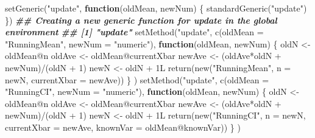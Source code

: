 \documentclass[
  12pt,
  krantz2]{krantz}
\makeatletter
\newenvironment{Shaded}{\begin{snugshade}}{\end{snugshade}}
\newcommand{\AttributeTok}[1]{\textcolor[rgb]{0.61,0.61,0.61}{#1}}
\newcommand{\ControlFlowTok}[1]{\textcolor[rgb]{0.27,0.27,0.27}{\textbf{#1}}}
\newcommand{\DecValTok}[1]{\textcolor[rgb]{0.06,0.06,0.06}{#1}}
\newcommand{\DocumentationTok}[1]{\textcolor[rgb]{0.37,0.37,0.37}{\textbf{\textit{#1}}}}
\newcommand{\FunctionTok}[1]{\textcolor[rgb]{0,0,0}{#1}}
\newcommand{\NormalTok}[1]{#1}
\newcommand{\OtherTok}[1]{\textcolor[rgb]{0.37,0.37,0.37}{#1}}
\newcommand{\SpecialCharTok}[1]{\textcolor[rgb]{0,0,0}{#1}}
\newcommand{\StringTok}[1]{\textcolor[rgb]{0.5,0.5,0.5}{#1}}
\newenvironment{kframe}{%
\medskip{}
\setlength{\fboxsep}{.8em}
 \def\at@end@of@kframe{}%
 \ifinner\ifhmode%
  \def\at@end@of@kframe{\end{minipage}}%
  \begin{minipage}{\columnwidth}%
 \fi\fi%
 \def\FrameCommand##1{\hskip\@totalleftmargin \hskip-\fboxsep
 \colorbox{shadecolor}{##1}\hskip-\fboxsep
     \hskip-\linewidth \hskip-\@totalleftmargin \hskip\columnwidth}%
 \MakeFramed {\advance\hsize-\width
   \@totalleftmargin\z@ \linewidth\hsize
   \@setminipage}}%
 {\par\unskip\endMakeFramed%
 \at@end@of@kframe}
\renewenvironment{Shaded}{\begin{kframe}}{\end{kframe}}
\makeatother
\begin{document}
\begin{Shaded}
\begin{Highlighting}[]
\FunctionTok{setGeneric}\NormalTok{(}\StringTok{"update"}\NormalTok{, }\ControlFlowTok{function}\NormalTok{(oldMean, newNum) \{}
  \FunctionTok{standardGeneric}\NormalTok{(}\StringTok{"update"}\NormalTok{)}
\NormalTok{\})}
\DocumentationTok{\#\# Creating a new generic function for \textquotesingle{}update\textquotesingle{} in the global environment}
\DocumentationTok{\#\# [1] "update"}
\FunctionTok{setMethod}\NormalTok{(}\StringTok{"update"}\NormalTok{,}
          \FunctionTok{c}\NormalTok{(}\AttributeTok{oldMean =} \StringTok{"RunningMean"}\NormalTok{, }\AttributeTok{newNum =} \StringTok{"numeric"}\NormalTok{),}
          \ControlFlowTok{function}\NormalTok{(oldMean, newNum) \{}
\NormalTok{            oldN }\OtherTok{\textless{}{-}}\NormalTok{ oldMean}\SpecialCharTok{@}\NormalTok{n}
\NormalTok{            oldAve }\OtherTok{\textless{}{-}}\NormalTok{ oldMean}\SpecialCharTok{@}\NormalTok{currentXbar}
\NormalTok{            newAve }\OtherTok{\textless{}{-}}\NormalTok{ (oldAve}\SpecialCharTok{*}\NormalTok{oldN }\SpecialCharTok{+}\NormalTok{ newNum)}\SpecialCharTok{/}\NormalTok{(oldN }\SpecialCharTok{+} \DecValTok{1}\NormalTok{)}
\NormalTok{            newN }\OtherTok{\textless{}{-}}\NormalTok{ oldN }\SpecialCharTok{+}\NormalTok{ 1L}
            \FunctionTok{return}\NormalTok{(}\FunctionTok{new}\NormalTok{(}\StringTok{"RunningMean"}\NormalTok{, }\AttributeTok{n =}\NormalTok{ newN, }\AttributeTok{currentXbar =}\NormalTok{ newAve))}
\NormalTok{          \}}
\NormalTok{)}
\FunctionTok{setMethod}\NormalTok{(}\StringTok{"update"}\NormalTok{,}
          \FunctionTok{c}\NormalTok{(}\AttributeTok{oldMean =} \StringTok{"RunningCI"}\NormalTok{, }\AttributeTok{newNum =} \StringTok{"numeric"}\NormalTok{),}
          \ControlFlowTok{function}\NormalTok{(oldMean, newNum) \{}
\NormalTok{            oldN }\OtherTok{\textless{}{-}}\NormalTok{ oldMean}\SpecialCharTok{@}\NormalTok{n}
\NormalTok{            oldAve }\OtherTok{\textless{}{-}}\NormalTok{ oldMean}\SpecialCharTok{@}\NormalTok{currentXbar}
\NormalTok{            newAve }\OtherTok{\textless{}{-}}\NormalTok{ (oldAve}\SpecialCharTok{*}\NormalTok{oldN }\SpecialCharTok{+}\NormalTok{ newNum)}\SpecialCharTok{/}\NormalTok{(oldN }\SpecialCharTok{+} \DecValTok{1}\NormalTok{)}
\NormalTok{            newN }\OtherTok{\textless{}{-}}\NormalTok{ oldN }\SpecialCharTok{+}\NormalTok{ 1L}
            \FunctionTok{return}\NormalTok{(}\FunctionTok{new}\NormalTok{(}\StringTok{"RunningCI"}\NormalTok{, }\AttributeTok{n =}\NormalTok{ newN, }\AttributeTok{currentXbar =}\NormalTok{ newAve, }
                       \AttributeTok{knownVar =}\NormalTok{ oldMean}\SpecialCharTok{@}\NormalTok{knownVar))}
\NormalTok{          \}}
\NormalTok{)}
\end{Highlighting}
\end{Shaded}
\end{document}
